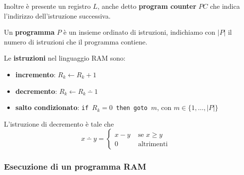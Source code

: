 Inoltre è presente un registro $L$, anche detto \textbf{program counter} $PC$ che indica l'indirizzo dell'istruzione successiva. 

Un \textbf{programma} $P$ è un insieme ordinato di istruzioni, indichiamo con $|P|$ il numero di istruzioni che il programma contiene.

Le \textbf{istruzioni} nel linguaggio RAM sono: 
\begin{itemize}
	\item \textbf{incremento}: $R_k \leftarrow R_k + 1$
	
    \item \textbf{decremento}: $R_k \leftarrow R_k \dotminus 1$
	
    \item \textbf{salto condizionato}: \texttt{if $R_k = 0$ then goto $m$}, con $m \in \{1, \dots, |P|\}$
\end{itemize}
L'istruzione di decremento è tale che
$$ x \dotminus y = \begin{cases}
	x-y & \text{ se } x \geq y\\
	0 & \text{ altrimenti }
\end{cases}$$

\begin{center}
	
\end{center}

\subsubsection{Esecuzione di un programma RAM}

